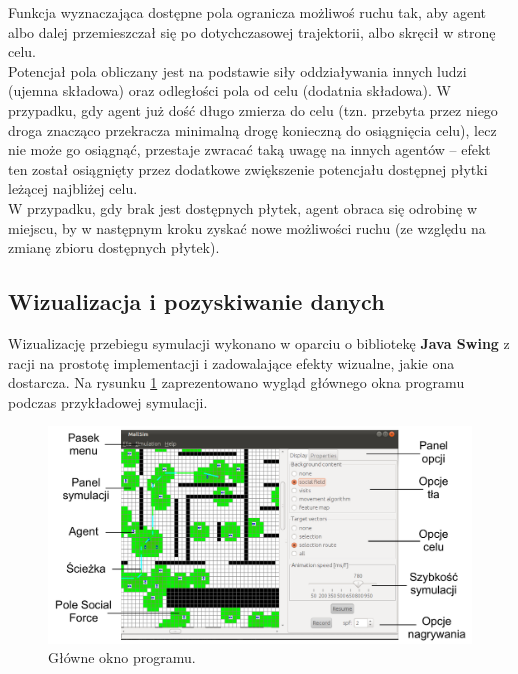 \documentclass[a4paper, 12pt]{article}
\begin{document}
\indent Funkcja wyznaczająca dostępne pola ogranicza możliwoś ruchu tak, aby agent albo dalej przemieszczał się po dotychczasowej trajektorii, albo skręcił w stronę celu. \\
\indent Potencjał pola obliczany jest na podstawie siły oddziaływania innych ludzi (ujemna składowa) oraz odległości pola od celu (dodatnia składowa). W przypadku, gdy agent już dość długo zmierza do celu (tzn. przebyta przez niego droga znacząco przekracza minimalną drogę konieczną do osiągnięcia celu), lecz nie może go osiągnąć, przestaje zwracać taką uwagę na innych agentów – efekt ten został osiągnięty przez dodatkowe zwiększenie potencjału dostępnej płytki leżącej najbliżej celu. \\
\indent W przypadku, gdy brak jest dostępnych płytek, agent obraca się odrobinę w miejscu, by w następnym kroku zyskać nowe możliwości ruchu (ze względu na zmianę zbioru dostępnych płytek).

\newpage
        \subsection{Wizualizacja i pozyskiwanie danych}
        \label{sec:vis-and-data}

        Wizualizację przebiegu symulacji wykonano w oparciu o bibliotekę \textbf{Java Swing} z racji na prostotę implementacji i zadowalające efekty wizualne, jakie ona dostarcza. Na rysunku \ref{fig:mall-sim-win} zaprezentowano wygląd głównego okna programu podczas przykładowej symulacji.

        \begin{figure}[H]
            \centering
            \includegraphics[scale=0.5]{./img/MallSim.pdf}
            \caption{Główne okno programu.}
            \label{fig:mall-sim-win}
        \end{figure}
\end{document}
